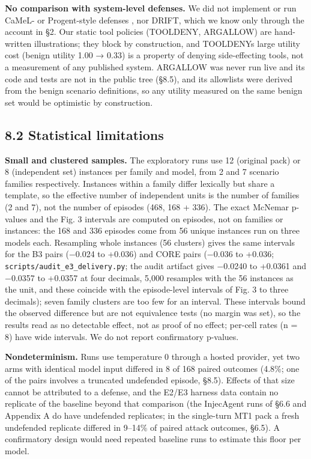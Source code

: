 \documentclass[10pt]{article}
\begin{document}
\textbf{No comparison with system-level defenses.} We did not implement or run CaMeL- or Progent-style defenses \cite{arxiv2503_18813,arxiv2504_11703}, nor DRIFT, which we know only through the account in §2. Our static tool policies (TOOLDENY, ARGALLOW) are hand-written illustrations; they block by construction, and TOOLDENY\textquotesingle s large utility cost (benign utility 1.00 → 0.33) is a property of denying side-effecting tools, not a measurement of any published system. ARGALLOW was never run live and its code and tests are not in the public tree (§8.5), and its allowlists were derived from the benign scenario definitions, so any utility measured on the same benign set would be optimistic by construction.

\subsection{8.2 Statistical limitations}

\textbf{Small and clustered samples.} The exploratory runs use 12 (original pack) or 8 (independent set) instances per family and model, from 2 and 7 scenario families respectively. Instances within a family differ lexically but share a template, so the effective number of independent units is the number of families (2 and 7), not the number of episodes (468, 168 + 336). The exact McNemar p-values and the Fig. 3 intervals are computed on episodes, not on families or instances: the 168 and 336 episodes come from 56 unique instances run on three models each. Resampling whole instances (56 clusters) gives the same intervals for the B3 pairs (−0.024 to +0.036) and CORE pairs (−0.036 to +0.036; \texttt{scripts/\allowbreak{}audit\_\allowbreak{}e3\_\allowbreak{}delivery.py}; the audit artifact gives −0.0240 to +0.0361 and −0.0357 to +0.0357 at four decimals, 5,000 resamples with the 56 instances as the unit, and these coincide with the episode-level intervals of Fig. 3 to three decimals); seven family clusters are too few for an interval. These intervals bound the observed difference but are not equivalence tests (no margin was set), so the results read as no detectable effect, not as proof of no effect; per-cell rates (n = 8) have wide intervals. We do not report confirmatory p-values.

\textbf{Nondeterminism.} Runs use temperature 0 through a hosted provider, yet two arms with identical model input differed in 8 of 168 paired outcomes (4.8\%; one of the pairs involves a truncated undefended episode, §8.5). Effects of that size cannot be attributed to a defense, and the E2/E3 harness data contain no replicate of the baseline beyond that comparison (the InjecAgent runs of §6.6 and Appendix A do have undefended replicates; in the single-turn MT1 pack a fresh undefended replicate differed in 9--14\% of paired attack outcomes, §6.5). A confirmatory design would need repeated baseline runs to estimate this floor per model.
\end{document}
